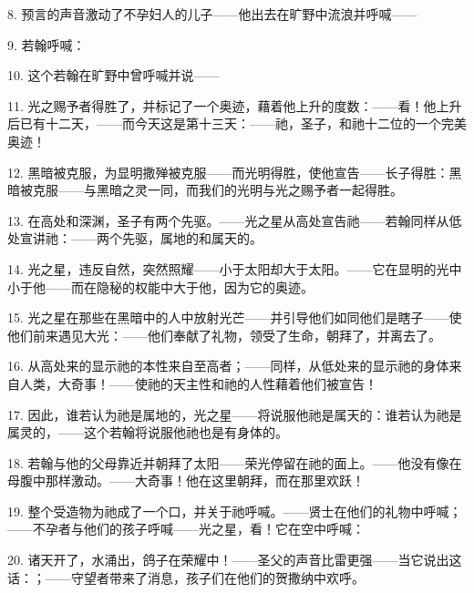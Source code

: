 8. 预言的声音激动了不孕妇人的儿子——他出去在旷野中流浪并呼喊——\par

9. 若翰呼喊：\par

10. 这个若翰在旷野中曾呼喊并说——\par

11. 光之赐予者得胜了，并标记了一个奥迹，藉着他上升的度数：——看！他上升后已有十二天，——而今天这是第十三天：——祂，圣子，和祂十二位的一个完美奥迹！\par

12. 黑暗被克服，为显明撒殚被克服——而光明得胜，使他宣告——长子得胜：黑暗被克服——与黑暗之灵一同，而我们的光明与光之赐予者一起得胜。\par

13. 在高处和深渊，圣子有两个先驱。——光之星从高处宣告祂——若翰同样从低处宣讲祂：——两个先驱，属地的和属天的。\par

14. 光之星，违反自然，突然照耀——小于太阳却大于太阳。——它在显明的光中小于他——而在隐秘的权能中大于他，因为它的奥迹。\par

15. 光之星在那些在黑暗中的人中放射光芒——并引导他们如同他们是瞎子——使他们前来遇见大光：——他们奉献了礼物，领受了生命，朝拜了，并离去了。\par

16. 从高处来的显示祂的本性来自至高者；——同样，从低处来的显示祂的身体来自人类，大奇事！——使祂的天主性和祂的人性藉着他们被宣告！\par

17. 因此，谁若认为祂是属地的，光之星——将说服他祂是属天的：谁若认为祂是属灵的，——这个若翰将说服他祂也是有身体的。\par

18. 若翰与他的父母靠近并朝拜了太阳——荣光停留在祂的面上。——他没有像在母腹中那样激动。——大奇事！他在这里朝拜，而在那里欢跃！\par

19. 整个受造物为祂成了一个口，并关于祂呼喊。——贤士在他们的礼物中呼喊；——不孕者与他们的孩子呼喊——光之星，看！它在空中呼喊：\par

20. 诸天开了，水涌出，鸽子在荣耀中！——圣父的声音比雷更强——当它说出这话：；——守望者带来了消息，孩子们在他们的贺撒纳中欢呼。\par

